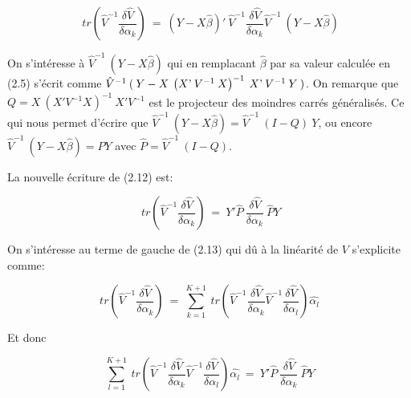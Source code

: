 \documentclass[12pt,fleqn]{book} %
\begin{document}
\begin{equation}
 \: tr\left( \hat{V}^{-1} \frac{ \delta \hat{V} }{\delta \alpha_k} \right)  \:=\: (Y-X\hat{\beta})'\:\hat{V}^{-1} \frac{ \delta \hat{V} }{\delta \alpha_k} \hat{V}^{-1}\:(Y-X\hat{\beta}) 
\end{equation}

\vspace{1em}

On s'intéresse à $\hat{V}^{-1}\:(Y-X\hat{\beta})$ qui en remplacant $\hat{\beta}$ par sa valeur calculée en (2.5) s'écrit comme $\hat{V}^{-1}\:(\: Y-X\:\left(  X\textnormal{'}\:V^{-1} \: X \right)^{-1} \: X\textnormal{'} \:V^{-1}\: Y \:)$. On remarque que $Q=X\:(X'V^{-1}X)^{-1}\:X' V^{-1}$ est le projecteur des moindres carrés généralisés. Ce qui nous permet d'écrire que $\hat{V}^{-1}\:(Y-X\hat{\beta})=\hat{V}^{-1}\:(I-Q)\:Y $, ou encore $\hat{V}^{-1}\:(Y-X\hat{\beta})=\hat{P}Y$ avec $\hat{P}=\hat{V}^{-1}\:(I-Q)$.

\vspace{1em}

La nouvelle écriture de (2.12) est:

\begin{equation}
 \: tr\left( \hat{V}^{-1} \frac{ \delta \hat{V} }{\delta \alpha_k} \right)  \:=\: Y'\hat{P}\:\frac{ \delta \hat{V} }{\delta \alpha_k}\: \hat{P} Y
\end{equation}

\vspace{1em}

On s'intéresse au terme de gauche de (2.13) qui dû à la linéarité de $V$ s'explicite comme:

\begin{equation*}
tr\left( \hat{V}^{-1} \frac{ \delta \hat{V} }{\delta \alpha_k} \right) \:=\: \sum_{k=1}^{K+1} \: tr\left(\hat{V}^{-1} \frac{ \delta \hat{V} }{\delta \alpha_k}  \hat{V}^{-1} \frac{ \delta \hat{V} }{\delta \alpha_l}\right) \hat{\alpha_l}
\end{equation*}

\vspace{1em}

Et donc

\begin{equation*}
\sum_{l=1}^{K+1} \: tr\left(\hat{V}^{-1} \frac{ \delta \hat{V} }{\delta \alpha_k}  \hat{V}^{-1} \frac{ \delta \hat{V} }{\delta \alpha_l}\right) \hat{\alpha_l} \:=\: Y'\hat{P}\:\frac{ \delta \hat{V} }{\delta \alpha_k}\: \hat{P} Y
\end{equation*}
\end{document}
